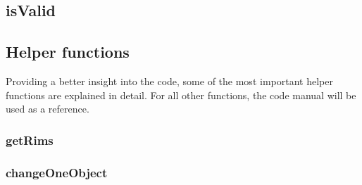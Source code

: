 \subsection{isValid}
\subsection{Helper functions}
Providing a better insight into the code, some of the most important helper functions are explained in detail. For all other functions, the code manual will be used as a reference.
\subsubsection{getRims}
\subsubsection{changeOneObject}
